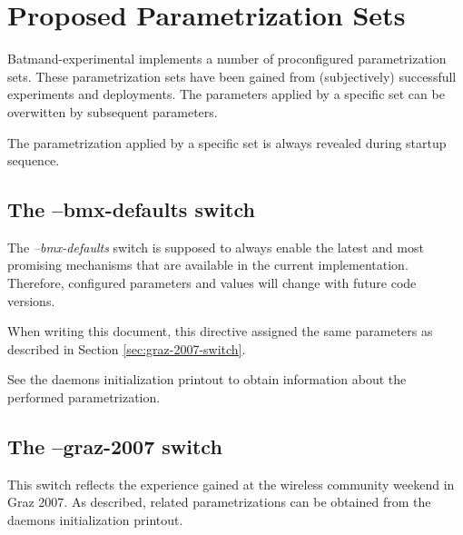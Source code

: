 \documentclass[11pt]{article}
\begin{document}

\section{Proposed Parametrization Sets}
\label{sec:proposed-parametrizations}

Batmand-experimental implements a number of proconfigured parametrization sets.
These parametrization sets have been gained from (subjectively) successfull experiments and deployments.
The parameters applied by a specific set can be overwitten by subsequent parameters.

The parametrization applied by a specific set is always revealed during startup sequence.

\subsection{The --bmx-defaults switch}

The \emph{--bmx-defaults} switch is supposed to always enable the latest and most promising mechanisms that
are available in the current implementation. 
Therefore, configured parameters and values will change with future code versions.

When writing this document, this directive assigned the same parameters as described in Section \ref{sec:graz-2007-switch}.

See the daemons initialization printout to obtain information about the performed parametrization.


\subsection{The --graz-2007 switch}

This switch reflects the experience gained at the wireless community weekend in Graz 2007.
As described, related parametrizations can be obtained from the daemons initialization printout. 
\end{document}
